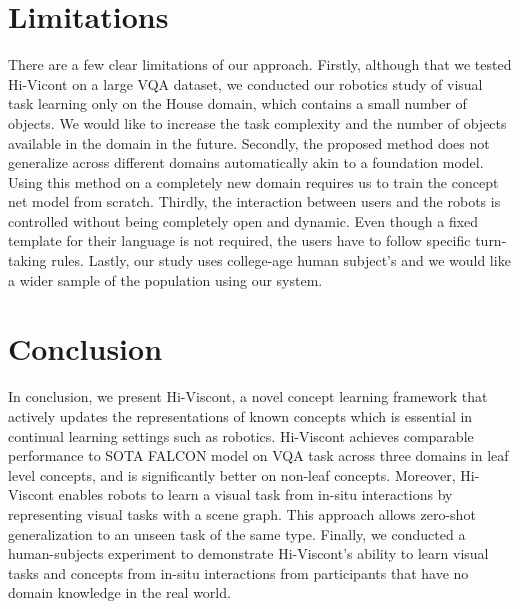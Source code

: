 \section{Limitations}
There are a few clear limitations of our approach.
Firstly, although that we tested Hi-Vicont on a large VQA dataset, we conducted our robotics study of visual task learning only on the House domain, which contains a small number of objects. We would like to increase the task complexity and the number of objects available in the domain in the future. 
Secondly, the proposed method does not generalize across different domains automatically akin to a foundation model. Using this method on a completely new domain requires us to train the concept net model from scratch.
Thirdly, the interaction between users and the robots is controlled without being completely open and dynamic. Even though a fixed template for their language is not required, the users have to follow specific turn-taking rules. Lastly, our study uses college-age human subject's and we would like a wider sample of the population using our system.

\section{Conclusion}
In conclusion, we present Hi-Viscont, a novel concept learning framework that actively updates the representations of known concepts which is essential in continual learning settings such as robotics.
Hi-Viscont achieves comparable performance to SOTA FALCON model on VQA task across three domains in leaf level concepts, and is significantly better on non-leaf concepts.
Moreover, Hi-Viscont enables robots to learn a visual task from in-situ interactions by representing visual tasks with a scene graph. This approach allows zero-shot generalization to an unseen task of the same type.
Finally, we conducted a human-subjects experiment to demonstrate Hi-Viscont's ability to learn visual tasks and concepts from in-situ interactions from participants that have no domain knowledge in the real world.

